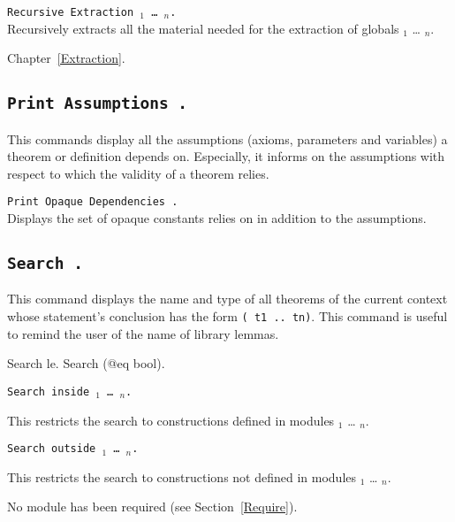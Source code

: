 \begin{Variants}
\item \texttt{Recursive Extraction {\qualid$_1$} \ldots{} {\qualid$_n$}.}\\
  Recursively extracts all the material needed for the extraction of 
  globals {\qualid$_1$} \ldots{} {\qualid$_n$}.
\end{Variants}

\SeeAlso Chapter~\ref{Extraction}.

\subsection[\tt Print Assumptions {\qualid}.]{\tt Print Assumptions {\qualid}.}
\label{PrintAssumptions}

This commands display all the assumptions (axioms, parameters and
variables) a theorem or definition depends on.  Especially, it informs
on the assumptions with respect to which the validity of a theorem
relies.

\begin{Variants}
\item \texttt{\tt Print Opaque Dependencies {\qualid}.
  }\\
  Displays the set of opaque constants {\qualid} relies on in addition
  to the assumptions.
\end{Variants}

\subsection[\tt Search {\term}.]{\tt Search {\term}.}
This command displays the name and type of all theorems of the current
context whose statement's conclusion has the form {\tt ({\term} t1 ..
  tn)}.  This command is useful to remind the user of the name of
library lemmas.

\begin{coq_example}
Search le.
Search (@eq bool).
\end{coq_example}

\begin{Variants}
\item
{\tt Search {\term} inside {\module$_1$} \ldots{} {\module$_n$}.}

This restricts the search to constructions defined in modules
{\module$_1$} \ldots{} {\module$_n$}.

\item {\tt Search {\term} outside {\module$_1$} \ldots{} {\module$_n$}.}

This restricts the search to constructions not defined in modules
{\module$_1$} \ldots{} {\module$_n$}.

\begin{ErrMsgs}
\item {}
No module \module{} has been required (see Section~\ref{Require}).
\end{ErrMsgs}

\end{Variants}


